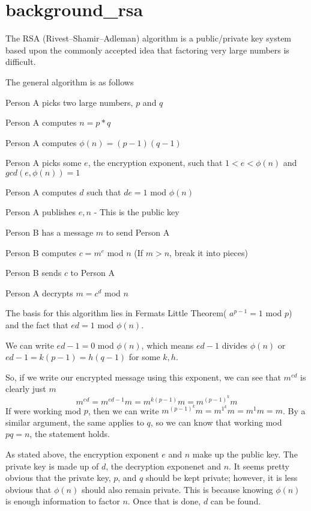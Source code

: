 \hypertarget{rsa_background_rsa}{}\section{background\+\_\+rsa}\label{rsa_background_rsa}
The R\+SA (Rivest–\+Shamir–\+Adleman) algorithm is a public/private key system based upon the commonly accepted idea that factoring very large numbers is difficult.

The general algorithm is as follows
\begin{DoxyItemize}
\item Person A picks two large numbers, $ p $ and $ q $
\item Person A computes $ n = p*q $
\item Person A computes $ \phi(n) = (p-1)(q-1)$
\item Person A picks some $ e $, the encryption exponent, such that $ 1 < e < \phi(n) $ and $ gcd(e, \phi(n)) = 1 $
\item Person A computes $ d $ such that $ de = 1 $ mod $ \phi(n) $
\item Person A publishes $ e, n $ -\/ This is the public key
\item Person B has a message $ m $ to send Person A
\item Person B computes $ c = m^e$ mod $ n $ (If $ m > n $, break it into pieces)
\item Person B sends $ c $ to Person A
\item Person A decrypts $ m = c^d $ mod $ n $
\end{DoxyItemize}

The basis for this algorithm lies in Fermat\textquotesingle{}s Little Theorem( $ a^{p-1} = 1 $ mod $ p $) and the fact that $ ed = 1 $ mod $ \phi(n) $.

We can write $ ed-1 = 0 $ mod $ \phi(n) $, which means $ ed-1 $ divides $ \phi(n) $ or $ ed-1 = k(p-1) = h(q-1) $ for some $ k, h $.

So, if we write our encrypted message using this exponent, we can see that $ m^{ed} $ is clearly just $ m $ \[m^{ed} = m^{ed-1}m = m^{k(p-1)}m = m^{(p-1)^k}m \] If we\textquotesingle{}re working mod $ p $, then we can write $ m^{(p-1)^k}m = m^{1^k}m = m^1m = m $. By a similar argument, the same applies to $ q $, so we can know that working mod $ pq = n $, the statement holds.

As stated above, the encryption exponent $ e $ and $ n $ make up the public key. The private key is made up of $ d $, the decryption exponenet and $ n $. It seems pretty obvious that the private key, $ p $, and $ q $ should be kept private; however, it is less obvious that $ \phi(n) $ should also remain private. This is because knowing $ \phi(n) $ is enough information to factor $ n $. Once that is done, $ d $ can be found.

